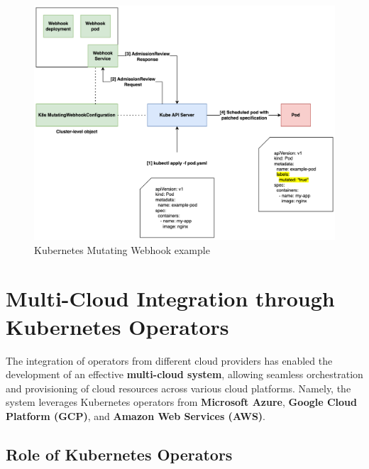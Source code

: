 \begin{figure}[htb]
  \centering
  \includegraphics[width=1\linewidth]{images/k8s_webhook_example.png}
  \caption{Kubernetes Mutating Webhook example \cite{kubernetes_mutating_webhook_example}}
  \label{fig:k8s_webhook_example}
\end{figure}

\section{Multi-Cloud Integration through Kubernetes Operators}

The integration of operators from different cloud providers has enabled the development of an effective \textbf{multi-cloud system}, allowing seamless orchestration and provisioning of cloud resources across various cloud platforms. Namely, the system leverages Kubernetes operators from \textbf{Microsoft Azure}, \textbf{Google Cloud Platform (GCP)}, and \textbf{Amazon Web Services (AWS)}.

\subsection{Role of Kubernetes Operators}


